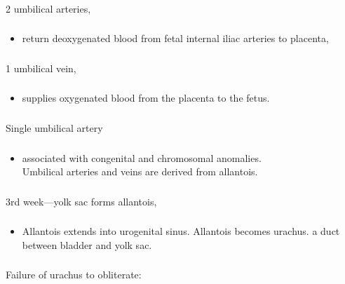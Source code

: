\documentclass[11pt]{beamer}
\begin{document}
\begin{frame}
 \frametitle{}
2 umbilical arteries,
\end{frame}

\begin{frame}
 \frametitle{}
\begin{itemize}
\item{return deoxygenated blood from fetal internal iliac arteries to placenta,}
\end{itemize}
\end{frame}

\begin{frame}
 \frametitle{}
1 umbilical vein,
\end{frame}

\begin{frame}
 \frametitle{}
\begin{itemize}
\item{supplies oxygenated blood from the placenta to the fetus.}
\end{itemize}
\end{frame}

\begin{frame}
 \frametitle{}
Single umbilical artery
\end{frame}

\begin{frame}
 \frametitle{}
\begin{itemize}
\item{associated with congenital and chromosomal anomalies. \\ Umbilical arteries and veins are derived from allantois.}
\end{itemize}
\end{frame}

\begin{frame}
 \frametitle{}
3rd week—yolk sac forms allantois,
\end{frame}

\begin{frame}
 \frametitle{}
\begin{itemize}
\item{Allantois extends into urogenital sinus. Allantois becomes urachus. a duct between bladder and yolk sac.}
\end{itemize}
\end{frame}

\begin{frame}
 \frametitle{}
Failure of urachus to obliterate:
\end{frame}
\end{document}
